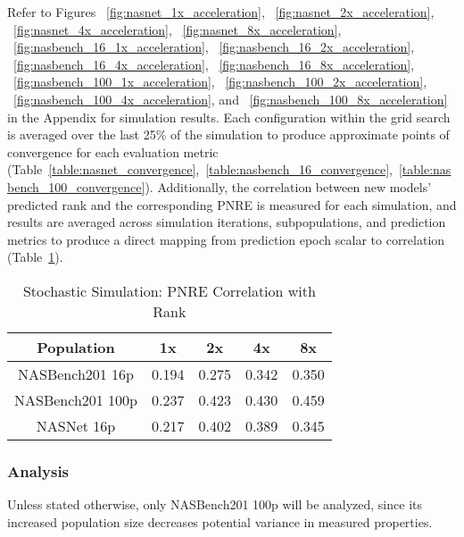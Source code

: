 \documentclass[twocolumn]{article}
\begin{document}
Refer to Figures 
~\ref{fig:nasnet_1x_acceleration}, 
~\ref{fig:nasnet_2x_acceleration}, 
~\ref{fig:nasnet_4x_acceleration},
~\ref{fig:nasnet_8x_acceleration},
~\ref{fig:nasbench_16_1x_acceleration},
~\ref{fig:nasbench_16_2x_acceleration},
~\ref{fig:nasbench_16_4x_acceleration},
~\ref{fig:nasbench_16_8x_acceleration},
~\ref{fig:nasbench_100_1x_acceleration},
~\ref{fig:nasbench_100_2x_acceleration},
~\ref{fig:nasbench_100_4x_acceleration},
and ~\ref{fig:nasbench_100_8x_acceleration}
in the Appendix for simulation results.
Each configuration within the grid search is averaged over the last 25\% of the simulation to produce approximate points of convergence for each evaluation metric 
(Table~\ref{table:nasnet_convergence},~\ref{table:nasbench_16_convergence},~\ref{table:nasbench_100_convergence}).
Additionally, the correlation between new models' predicted rank and the corresponding PNRE is measured for each simulation,
and results are averaged across simulation iterations, subpopulations, and prediction metrics to produce a direct mapping from prediction epoch scalar to correlation (Table~\ref{table:rank_error_corr}).

\begin{table}[!h]
    \begin{center}
        \begin{tabular}{c | c | c | c | c}
            \toprule
            Population          & 1x    & 2x    &4x     & 8x    \\
            \midrule
            NASBench201 16p     & 0.194 & 0.275 & 0.342 & 0.350 \\
            NASBench201 100p    & 0.237 & 0.423 & 0.430 & 0.459 \\
            NASNet 16p          & 0.217 & 0.402 & 0.389 & 0.345 \\
            \bottomrule
        \end{tabular}
        \caption{Stochastic Simulation: PNRE Correlation with Rank}
        \label{table:rank_error_corr}
    \end{center}
\end{table}

\subsubsection{Analysis}

Unless stated otherwise, only NASBench201 100p will be analyzed, since its increased population size decreases potential variance in measured properties.
\end{document}
